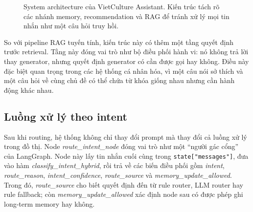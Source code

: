 \documentclass[11pt]{article}
\begin{document}
\begin{figure}[t]
{
}
\caption{System architecture của VietCulture Assistant. Kiến trúc tách rõ các nhánh memory, recommendation và RAG để tránh xử lý mọi tin nhắn như một câu hỏi truy hồi.}
\label{fig:pipeline}
\end{figure}

So với pipeline RAG tuyến tính, kiến trúc này có thêm một tầng quyết định trước retrieval. Tầng này đóng vai trò như bộ điều phối hành vi: nó không trả lời thay generator, nhưng quyết định generator có cần được gọi hay không. Điều này đặc biệt quan trọng trong các hệ thống cá nhân hóa, vì một câu nói sở thích và một câu hỏi về cùng chủ đề có thể chứa từ khóa giống nhau nhưng cần hành động khác nhau.

\subsection{Luồng xử lý theo intent}

Sau khi routing, hệ thống không chỉ thay đổi prompt mà thay đổi cả luồng xử lý trong đồ thị. Node \textit{route\_intent\_node} đóng vai trò như một ``người gác cổng'' của LangGraph. Node này lấy tin nhắn cuối cùng trong \texttt{state["messages"]}, đưa vào hàm \textit{classify\_intent\_hybrid}, rồi trả về các biến điều phối gồm \textit{intent}, \textit{route\_reason}, \textit{intent\_confidence}, \textit{route\_source} và \textit{memory\_update\_allowed}. Trong đó, \textit{route\_source} cho biết quyết định đến từ rule router, LLM router hay rule fallback; còn \textit{memory\_update\_allowed} xác định node sau có được phép ghi long-term memory hay không.
\end{document}
